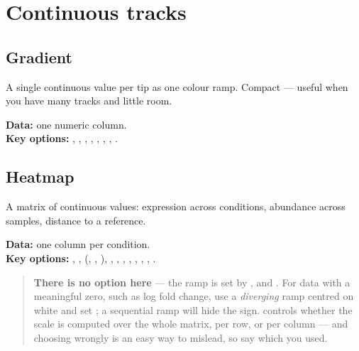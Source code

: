 
\section{Continuous tracks}

\subsection{Gradient}

A single continuous value per tip as one colour ramp. Compact --- useful when you
have many tracks and little room.

\textbf{Data:} one numeric column.\\
\textbf{Key options:} , , ,
, , , ,
.


\subsection{Heatmap}

A matrix of continuous values: expression across conditions, abundance across
samples, distance to a reference.

\textbf{Data:} one column per condition.\\
\textbf{Key options:} , , 
(, , ), , ,
, , , ,
, .

\begin{quote}
\textbf{There is no  option here} --- the ramp is set by
,  and . For data with a
meaningful zero, such as log fold change, use a \emph{diverging} ramp centred on
white and set ; a sequential ramp will hide the sign.
 controls whether the scale is computed over the whole matrix, per
row, or per column --- and choosing wrongly is an easy way to mislead, so say
which you used.
\end{quote}


